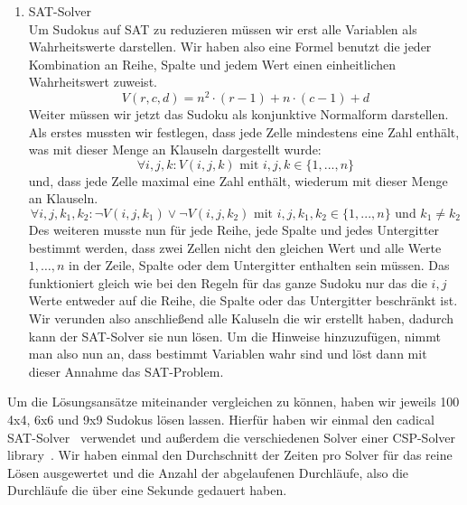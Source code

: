 \begin{enumerate}
    \item SAT-Solver \\
    Um Sudokus auf SAT zu reduzieren müssen wir erst alle Variablen als Wahrheitswerte darstellen. Wir haben also eine Formel benutzt die jeder Kombination an Reihe, Spalte und jedem Wert einen einheitlichen Wahrheitswert zuweist.
    \begin{equation}
        V(r, c, d) = n^2 \cdot (r - 1) + n \cdot (c - 1) + d
    \end{equation}
    Weiter müssen wir jetzt das Sudoku als konjunktive Normalform darstellen. 
    Als erstes mussten wir festlegen, dass jede Zelle mindestens eine Zahl enthält, was mit dieser Menge an Klauseln dargestellt wurde:
    \begin{equation}
        \forall i, j, k: V(i, j, k) \text{ mit } i, j, k \in \{1, ..., n\} %
    \end{equation}
    und, dass jede Zelle maximal eine Zahl enthält, wiederum mit dieser Menge an Klauseln.
    \begin{equation}
        \forall i, j, k_1, k_2: \neg V(i, j, k_1) \vee \neg V(i, j, k_2) \text{ mit }i, j, k_1, k_2 \in \{1, ..., n\} \text{ und } k_1 \neq k_2 %
    \end{equation}
    Des weiteren musste nun für jede Reihe, jede Spalte und jedes Untergitter bestimmt werden, dass zwei Zellen nicht den gleichen Wert und alle Werte $1, \dots, n$ %
    in der Zeile, Spalte oder dem Untergitter enthalten sein müssen.
    Das funktioniert gleich wie bei den Regeln für das ganze Sudoku nur das die $i, j$ Werte entweder auf die Reihe, die Spalte oder das Untergitter beschränkt ist.
    Wir verunden also anschließend alle Kaluseln die wir erstellt haben, dadurch kann der SAT-Solver sie nun lösen.
    Um die Hinweise hinzuzufügen, nimmt man also nun an, dass bestimmt Variablen wahr sind und löst dann mit dieser Annahme das SAT-Problem.
\end{enumerate}

Um die Lösungsansätze miteinander vergleichen zu können, haben wir jeweils 100 4x4, 6x6 und 9x9 Sudokus lösen lassen.
Hierfür haben wir einmal den cadical SAT-Solver~\cite{pysat} verwendet und außerdem die verschiedenen Solver einer CSP-Solver library~\cite{pycsp}.
Wir haben einmal den Durchschnitt der Zeiten pro Solver für das reine Lösen ausgewertet und die Anzahl der abgelaufenen Durchläufe, also die Durchläufe die über eine Sekunde gedauert haben.

